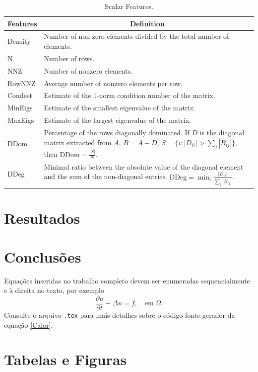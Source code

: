 \documentclass{pssbmac}
\begin{document}
\begin{table}
    \centering
    \caption{Scalar Features.}
    \label{tab:scalar_features}
\begin{tabular}{@{}p{2cm}p{9cm}@{}}
    \toprule
    \textbf{Features} &  \multicolumn{1}{c}{\textbf{Definition}} \\
    \midrule
    Density & Number of non-zero elements divided by the total number of elements. \\
    N& Number of rows. \\
    NNZ & Number of nonzero elements. \\
    RowNNZ & Average number of nonzero elements per row. \\
    Condest & Estimate of the 1-norm condition number of the matrix. \\
    MinEigs & Estimate of the smallest eigenvalue of the matrix. \\
    MaxEigs & Estimate of the largest eigenvalue of the matrix. \\
    DDom & Percentage of the rows diagonally dominated. If $D$ is the diagonal matrix extracted from $A$, $B = A - D$, $S = \{ i: |D_{ii}| > \sum_j{|B_{ij}|}\}$, then $\text{DDom} = \frac{|S|}{N}.$\\
    DDeg & Minimal ratio between the absolute value of the diagonal element and the sum of the non-diagonal entries. $\text{DDeg} = \min_{i}\frac{|D_{ii}|}{\sum_j{|B_{ij}|}}$.\\
     \bottomrule
\end{tabular}
\end{table}
\section{Resultados}\label{sec:results}
\section{Conclusões}\label{sec:conclusions}



Equações inseridas no trabalho completo devem ser enumeradas sequencialmente e à direita no texto, por exemplo
\begin{equation}
\frac{\partial u}{\partial t}-\Delta u = f, \quad  \mathrm{em} \; \Omega. \label{Calor}
\end{equation}
Consulte o arquivo \verb!.tex! para mais detalhes sobre o código-fonte gerador da equação \eqref{Calor}.

\section{Tabelas e Figuras}
\end{document}
